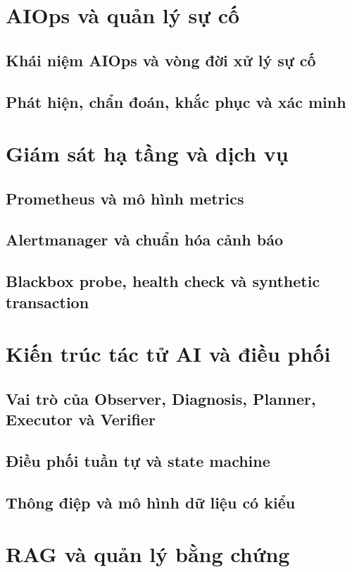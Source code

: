\section{AIOps và quản lý sự cố}
\subsection{Khái niệm AIOps và vòng đời xử lý sự cố}
\subsection{Phát hiện, chẩn đoán, khắc phục và xác minh}


\section{Giám sát hạ tầng và dịch vụ}
\subsection{Prometheus và mô hình metrics}
\subsection{Alertmanager và chuẩn hóa cảnh báo}
\subsection{Blackbox probe, health check và synthetic transaction}


\section{Kiến trúc tác tử AI và điều phối}
\subsection{Vai trò của Observer, Diagnosis, Planner, Executor và Verifier}
\subsection{Điều phối tuần tự và state machine}
\subsection{Thông điệp và mô hình dữ liệu có kiểu}


\section{RAG và quản lý bằng chứng}
